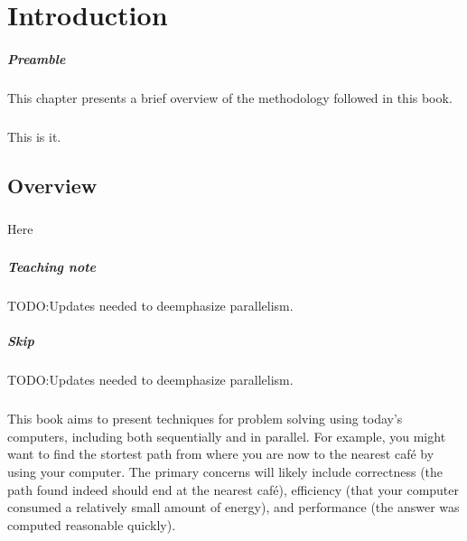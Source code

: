\chapter{Introduction}

\paragraph{Preamble}
This chapter presents a brief overview of the methodology followed in
this book.
\paragraph{}
This is it.
\section{Overview}

\paragraph{}
Here
\subsection{}

\paragraph{Teaching note}
TODO:Updates needed to deemphasize parallelism.

\paragraph{Skip}
TODO:Updates needed to deemphasize parallelism.

\paragraph{}
This book aims to present techniques for problem solving using today's
computers, including both sequentially and in parallel.
%
For example, you might want to find the stortest path from where you
are now to the nearest caf\'e by using your computer.
%
The primary concerns will likely include correctness (the path found
indeed should end at the nearest caf\'e), 
%
efficiency (that your computer consumed a relatively small amount of
energy), and performance (the answer was computed reasonable quickly).
%

